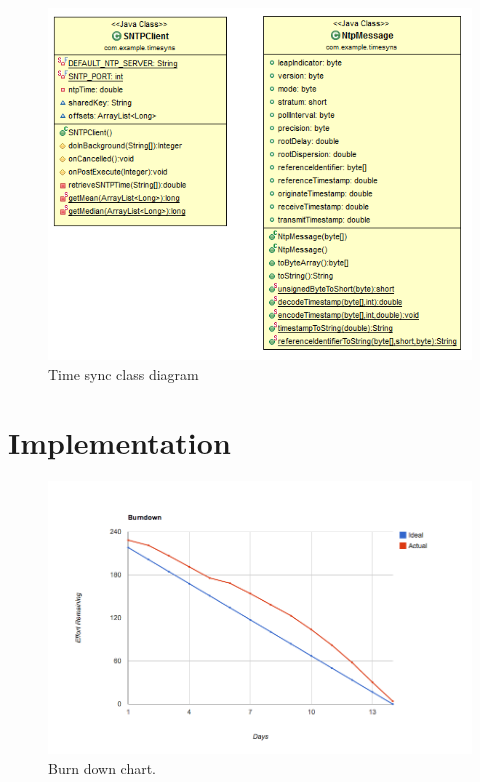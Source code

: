 \begin{figure}[H]
	\centering
		\includegraphics[width=14cm]{sprint5/sprint5_class_diagram.png}
	\caption{Time sync class diagram}
	\label{fig:Time_Sync_class }
\end{figure}

\section{Implementation} \label{txt:sprint5_immplementation}



\begin{figure}[H]
	\centering
		\includegraphics[width=18cm]{sprint5/BurndownSprint5.png}
	\caption{Burn down chart.}
	\label{fig:Burn5 }
\end{figure}


